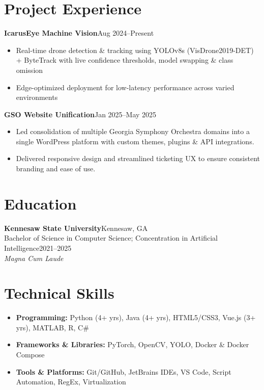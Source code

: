 \documentclass[letterpaper,10pt]{article}
\begin{document}
\section{Project Experience}

\noindent\textbf{IcarusEye Machine Vision}\hfill Aug 2024--Present
\begin{itemize}[leftmargin=*]
    \item Real-time drone detection \& tracking using YOLOv8s (VisDrone2019-DET) + ByteTrack with live confidence thresholds, model swapping \& class omission
    \item Edge-optimized deployment for low-latency performance across varied environments
\end{itemize}

\noindent\textbf{GSO Website Unification}\hfill Jan 2025--May 2025
\begin{itemize}[leftmargin=*]
    \item Led consolidation of multiple Georgia Symphony Orchestra domains into a single WordPress platform with custom themes, plugins \& API integrations.
    \item Delivered responsive design and streamlined ticketing UX to ensure consistent branding and ease of use.
\end{itemize}

\section{Education}

\noindent\textbf{Kennesaw State University}\hfill Kennesaw, GA\\
Bachelor of Science in Computer Science; Concentration in Artificial Intelligence\hfill 2021--2025\\
\textit{Magna Cum Laude}

\section*{Technical Skills}
\begin{itemize}[leftmargin=*]
  \item \textbf{Programming:} Python (4+ yrs), Java (4+ yrs), HTML5/CSS3, Vue.js (3+ yrs), MATLAB, R, C\#
  \item \textbf{Frameworks \& Libraries:} PyTorch, OpenCV, YOLO, Docker \& Docker Compose
  \item \textbf{Tools \& Platforms:} Git/GitHub, JetBrains IDEs, VS Code, Script Automation, RegEx, Virtualization
\end{itemize}
\end{document}
